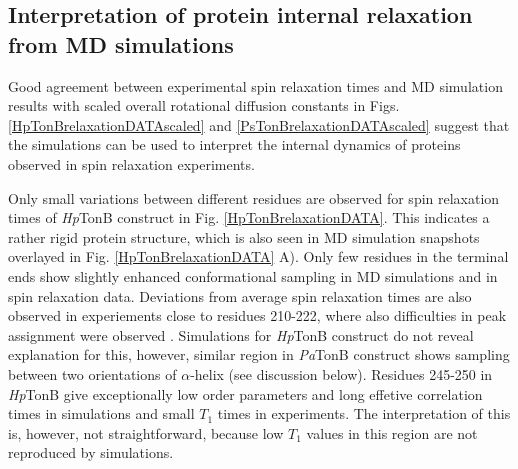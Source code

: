 \documentclass[pre,aps,floatfix,authordate1-4,twocolumn]{revtex4-1}
\begin{document}



\subsection{Interpretation of protein internal relaxation from MD simulations}
Good agreement between experimental spin relaxation times and MD simulation
results with scaled overall rotational diffusion constants in
Figs. \ref{HpTonBrelaxationDATAscaled} and \ref{PsTonBrelaxationDATAscaled}
suggest that the simulations can be used to interpret the internal
dynamics of proteins observed in spin relaxation experiments.

Only small variations between different residues are observed
for spin relaxation times of {\it Hp}TonB construct in Fig. \ref{HpTonBrelaxationDATA}.
This indicates a rather rigid protein structure, which is also seen in
MD simulation snapshots overlayed in Fig. \ref{HpTonBrelaxationDATA} A).
Only few residues in the terminal ends show slightly
enhanced conformational sampling in MD simulations and in
spin relaxation data. Deviations from average spin relaxation times
are also observed in experiements close to residues 210-222, where also 
difficulties in peak assignment were observed \cite{ciragan16}.
Simulations for {\it Hp}TonB construct do not reveal explanation for this,
however, similar region in {\it Pa}TonB construct shows 
sampling between two orientations of $\alpha$-helix (see discussion below).
Residues 245-250 in {\it Hp}TonB give exceptionally low order parameters
and long effetive correlation times in simulations and small $T_1$ times
in experiments. The interpretation of this is, however, not straightforward,
because low $T_1$ values in this region are not reproduced by simulations.
\end{document}
